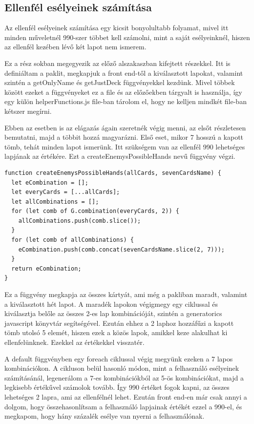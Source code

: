 \subsection{Ellenfél esélyeinek számítása}
Az ellenfél esélyeinek számítása egy kicsit bonyolultabb folyamat, mivel itt minden műveletnél 990-szer többet kell számolni, mint a saját esélyeinknél, hiszen az ellenfél kezében lévő két lapot nem ismerem.

Ez a rész sokban megegyezik az előző alszakaszban kifejtett részekkel. Itt is definiáltam a paklit, megkapjuk a front end-től a kiválasztott lapokat, valamint szintén a getOnlyName és getJustDeck függvényekkel kezdünk. Mivel többek között ezeket a függvényeket ez a file és az előzőekben tárgyalt is használja, így egy külön helperFunctions.js file-ban tárolom el, hogy ne kelljen mindkét file-ban kétszer megírni.

Ebben az esetben is az elágazás ágain szeretnék végig menni, az elsőt részletesen bemutatni, majd a többit hozzá magyarázni. Első eset, mikor 7 hosszú a kapott tömb, tehát minden lapot ismerünk. Itt szükségem van az ellenfél 990 lehetséges lapjának az értékére. Ezt a createEnemysPossibleHands nevű függvény végzi.

\newpage

\begin{lstlisting}[style=htmlcssjs]
function createEnemysPossibleHands(allCards, sevenCardsName) {
  let eCombination = [];
  let everyCards = [...allCards];
  let allCombinations = [];
  for (let comb of G.combination(everyCards, 2)) {
    allCombinations.push(comb.slice());
  }
  for (let comb of allCombinations) {
    eCombination.push(comb.concat(sevenCardsName.slice(2, 7)));
  }
  return eCombination;
}
\end{lstlisting}

Ez a függvény megkapja az összes kártyát, ami még a pakliban maradt, valamint a kiválasztott hét lapot. A maradék lapokon végigmegy egy ciklussal és kiválasztja belőle az összes 2-es lap kombinációját, szintén a generatorics javascript könyvtár segítségével. Ezután ehhez a 2 laphoz hozzáfűzi a kapott tömb utolsó 5 elemét, hiszen ezek a közös lapok, amikkel keze alakulhat ki ellenfelünknek. Ezekkel az értékekkel visszatér.

A default függvényben egy foreach ciklussal végig megyünk ezeken a 7 lapos kombinációkon. A cikluson belül hasonló módon, mint a felhasználó esélyeinek számításánál, legenerálom a 7-es kombinációkból az 5-ös kombinációkat, majd a legkisebb értékűvel számolok tovább. Így 990 értéket fogok kapni, az összes lehetséges 2 lapra, ami az ellenfélnél lehet. Ezután front end-en már csak annyi a dolgom, hogy összehasonlítsam a felhasználó lapjainak értékét ezzel a 990-el, és megkapom, hogy hány százalék esélye van nyerni a felhasználónak.

